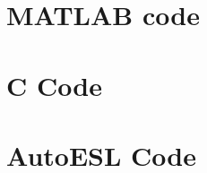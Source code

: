 \section{MATLAB code}
\label{apdx:matlabCode}


\section{C Code}
\label{apdx:cCode}


\section{AutoESL Code}
\label{apdx:autoeslCode}

